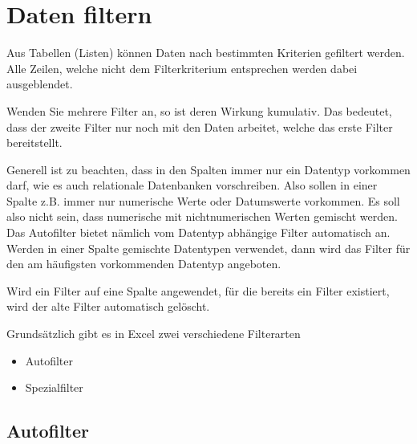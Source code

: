 \section{Daten filtern}

Aus Tabellen (Listen) können Daten nach bestimmten Kriterien gefiltert werden. Alle Zeilen, welche nicht dem Filterkriterium entsprechen werden dabei ausgeblendet.

Wenden Sie mehrere Filter an, so ist deren Wirkung kumulativ. Das bedeutet, dass der zweite Filter nur noch mit den Daten arbeitet, welche das erste Filter bereitstellt.

Generell ist zu beachten, dass in den Spalten immer nur ein Datentyp vorkommen darf, wie es auch relationale Datenbanken vorschreiben. Also sollen in einer Spalte z.B. immer nur numerische Werte oder Datumswerte vorkommen. Es soll also nicht sein, dass numerische mit nichtnumerischen Werten gemischt werden. Das Autofilter bietet nämlich vom Datentyp abhängige Filter automatisch an. Werden in einer Spalte gemischte Datentypen verwendet, dann wird das Filter für den am häufigsten vorkommenden Datentyp angeboten. 

Wird ein Filter auf eine Spalte angewendet,  für die bereits ein Filter existiert, wird der alte Filter automatisch gelöscht.


Grundsätzlich gibt es in Excel zwei verschiedene Filterarten
\begin{itemize}
	\smallitemize
	\item Autofilter
	\item Spezialfilter
\end{itemize}


\subsection{Autofilter}

